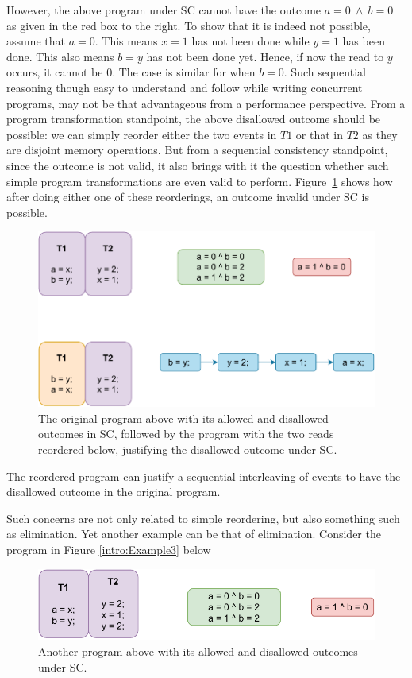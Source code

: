     
    However, the above program under SC cannot have the outcome $a=0\ \wedge\ b=0$ as given in the red box to the right. To show that it is indeed not possible, assume that $a=0$. This means $x=1$ has not been done while $y=1$ has been done. This also means $b=y$ has not been done yet. Hence, if now the read to $y$ occurs, it cannot be $0$. The case is similar for when $b=0$. 
    Such sequential reasoning though easy to understand and follow while writing concurrent programs, may not be that advantageous from a performance perspective.  
    From a program transformation standpoint, the above disallowed outcome should be possible: we can simply reorder either the two events in $T1$ or that in $T2$ as they are disjoint memory operations. 
    But from a sequential consistency standpoint, since the outcome is not valid, it also brings with it the question whether such simple program transformations are even valid to perform.
    Figure~\ref{intro:Example2} shows how after doing either one of these reorderings, an outcome invalid under SC is possible. 
    \begin{figure}[H]
        \centering
        \includegraphics[scale=0.7]{1.Introduction/SC_Example1(b).pdf}
        \caption{The original program above with its allowed and disallowed outcomes in SC, followed by the program with the two reads reordered below, justifying the disallowed outcome under SC.}
        \label{intro:Example2}
    \end{figure}

    The reordered program can justify a sequential interleaving of events to have the disallowed outcome in the original program. 

    Such concerns are not only related to simple reordering, but also something such as elimination. 
    Yet another example can be that of elimination. Consider the program in Figure \ref{intro:Example3} below
    \begin{figure}[H]
        \centering
        \includegraphics[scale=0.7]{1.Introduction/SC_Example2(a).pdf}
        \caption{Another program above with its allowed and disallowed outcomes under SC.}
        \label{intro:Example3(a)}
    \end{figure}


